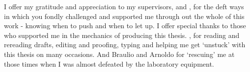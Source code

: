 \documentclass[
11pt, 
oneside,
english,
onehalfspacing,
onehalfspacing,
parskip,
headsepline,
]{MastersDoctoralThesis}
\begin{document}
\begin{acknowledgements}


I offer my gratitude and appreciation to my supervisors, \supname \textit{ } and \cosupname, for the deft ways in which you fondly challenged and supported me through out the whole of this work - knowing when to push and when to let up. I offer special thanks to those who supported me in the mechanics of producing this thesis. \supname, for reading and rereading drafts, editing and proofing, typing and helping me get ‘unstuck’ with this thesis on many occasions. And Braulio and Arnoldo for ‘rescuing’ me at those times when I was almost defeated by the laboratory equipment.

\end{acknowledgements}

\end{document}
